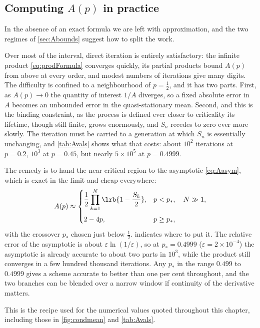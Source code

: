 \subsection{Computing \texorpdfstring{$A(p)$}{A(p)} in practice}
\label{sec:practical}

In the absence of an exact formula we are left with approximation, and the two
regimes of \cref{sec:Abounds} suggest how to split the work.

Over most of the interval, direct iteration is entirely satisfactory: the infinite
product \cref{eq:prodFormula} converges quickly, its partial products bound $A(p)$
from above at every order, and modest numbers of iterations give many digits. The
difficulty is confined to a neighbourhood of $p=\tfrac12$, and it has two parts.
First, as $A(p)\to0$ the quantity of interest $1/A$ diverges, so a fixed absolute
error in $A$ becomes an unbounded error in the quasi-stationary mean. Second, and
this is the binding constraint, as the process is defined ever closer to
criticality its lifetime, though still finite, grows enormously, and $S_n$ recedes
to zero ever more slowly. The iteration must be carried to a generation at which
$S_n$ is essentially unchanging, and \cref{tab:Avals} shows what that costs: about
$10^2$ iterations at $p=0.2$, $10^3$ at $p=0.45$, but nearly $5\times10^5$ at
$p=0.4999$.

The remedy is to hand the near-critical region to the asymptotic \cref{eq:Aasym},
which is exact in the limit and cheap everywhere:
\begin{equation}
\label{eq:Apractical}
A(p) \approx
\begin{cases}
\displaystyle \frac12\prod_{k=1}^{N}\lrb{1-\frac{S_k}{2}}, & p<p_\ast,\quad N\gg1,\\[14pt]
2-4p, & p\ge p_\ast,
\end{cases}
\end{equation}
with the crossover $p_\ast$ chosen just below $\tfrac12$.  indicates
where to put it. The relative error of the asymptotic is about
$\varepsilon\ln(1/\varepsilon)$, so at $p_\ast = 0.4999$
($\varepsilon = 2\times10^{-4}$) the asymptotic is already accurate to about two
parts in $10^3$, while the product still converges in a few hundred thousand
iterations. Any $p_\ast$ in the range $0.499$ to $0.4999$ gives a scheme accurate
to better than one per cent throughout, and the two branches can be blended over a
narrow window if continuity of the derivative matters.

This is the recipe used for the numerical values quoted throughout this chapter,
including those in \cref{fig:condmean} and \cref{tab:Avals}.

\FloatBarrier
